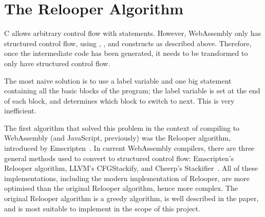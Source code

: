 \documentclass[00-main.tex]{subfiles}
\begin{document}




\section{The Relooper Algorithm}\label{sec:prep:relooper}

C allows arbitrary control flow with  statements.
However, WebAssembly only has structured control flow, using , , and  constructs as described above.
Therefore, once the intermediate code has been generated, it needs to be transformed to only have structured control flow.

The most naive solution is to use a label variable and one big  statement containing all the basic blocks of the program; the label variable is set at the end of each block, and determines which block to switch to next.
This is very inefficient.

The first algorithm that solved this problem in the context of compiling to WebAssembly (and JavaScript, previously) was the Relooper algorithm, introduced by Emscripten~.
In current WebAssembly compilers, there are three general methods used to convert to structured control flow: Emscripten's Relooper algorithm, LLVM's CFGStackify, and Cheerp's Stackifier~.
All of these implementations, including the modern implementation of Relooper, are more optimised than the original Relooper algorithm, hence more complex.
The original Relooper algorithm is a greedy algorithm, is well described in the paper, and is most suitable to implement in the scope of this project.
\end{document}
